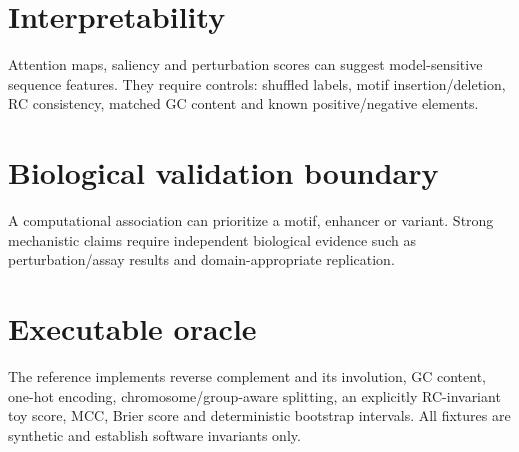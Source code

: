\section{Interpretability}
Attention maps, saliency and perturbation scores can suggest model-sensitive sequence features. They require controls: shuffled labels, motif insertion/deletion, RC consistency, matched GC content and known positive/negative elements.

\section{Biological validation boundary}
A computational association can prioritize a motif, enhancer or variant. Strong mechanistic claims require independent biological evidence such as perturbation/assay results and domain-appropriate replication.

\section{Executable oracle}
The reference implements reverse complement and its involution, GC content, one-hot encoding, chromosome/group-aware splitting, an explicitly RC-invariant toy score, MCC, Brier score and deterministic bootstrap intervals. All fixtures are synthetic and establish software invariants only.

